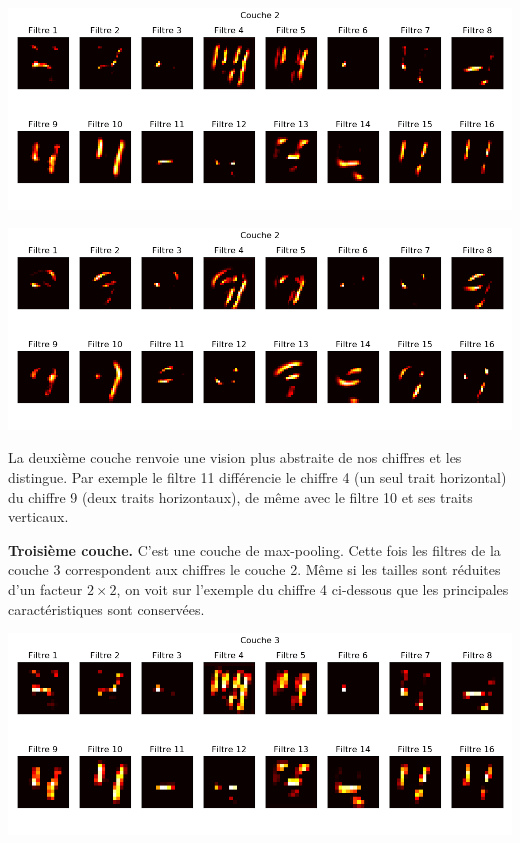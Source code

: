 \documentclass[11pt,class=report,crop=false]{standalone}
\begin{document}
\begin{center}
\includegraphics[scale=\myscale,scale=0.65]{figures/tfconv-viz2-n56-4-c2}
\end{center}

\begin{center}
\includegraphics[scale=\myscale,scale=0.65]{figures/tfconv-viz2-n58-9-c2}
\end{center}

La deuxième couche renvoie une vision plus abstraite de nos chiffres et les distingue. Par exemple le filtre 11 différencie le chiffre 4 (un seul trait horizontal) du chiffre 9 (deux traits horizontaux), de même avec le filtre 10 et ses traits verticaux.

\bigskip
\textbf{Troisième couche.}
C'est une couche de max-pooling. Cette fois les filtres de la couche 3 correspondent aux chiffres le couche 2. Même si les tailles sont réduites d'un facteur $2\times2$, on voit sur l'exemple du chiffre 4 ci-dessous que les principales caractéristiques sont conservées.

\begin{center}
\includegraphics[scale=\myscale,scale=0.65]{figures/tfconv-viz2-n56-4-c3}
\end{center}
\end{document}
